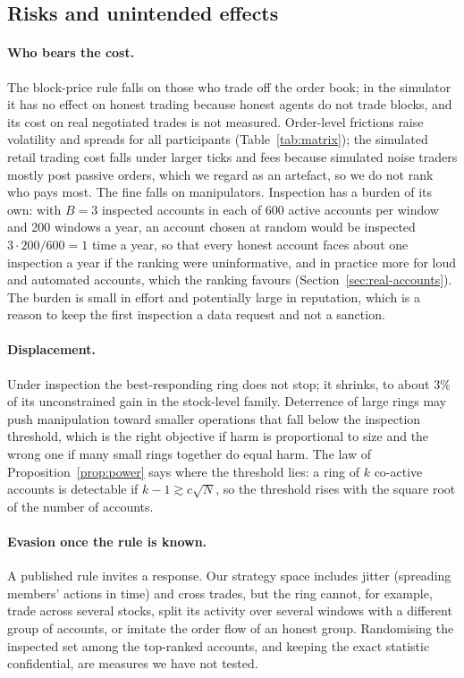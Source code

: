 \subsection{Risks and unintended effects}

\paragraph{Who bears the cost.} The block-price rule falls on those who trade off the order book; in the simulator it has no effect on honest trading because honest agents do not trade blocks, and its cost on real negotiated trades is not measured. Order-level frictions raise volatility and spreads for all participants (Table~\ref{tab:matrix}); the simulated retail trading cost falls under larger ticks and fees because simulated noise traders mostly post passive orders, which we regard as an artefact, so we do not rank who pays most. The fine falls on manipulators. Inspection has a burden of its own: with $B=3$ inspected accounts in each of 600 active accounts per window and 200 windows a year, an account chosen at random would be inspected $3\cdot200/600=1$ time a year, so that every honest account faces about one inspection a year if the ranking were uninformative, and in practice more for loud and automated accounts, which the ranking favours (Section~\ref{sec:real-accounts}). The burden is small in effort and potentially large in reputation, which is a reason to keep the first inspection a data request and not a sanction.

\paragraph{Displacement.} Under inspection the best-responding ring does not stop; it shrinks, to about 3\% of its unconstrained gain in the stock-level family. Deterrence of large rings may push manipulation toward smaller operations that fall below the inspection threshold, which is the right objective if harm is proportional to size and the wrong one if many small rings together do equal harm. The law of Proposition~\ref{prop:power} says where the threshold lies: a ring of $k$ co-active accounts is detectable if $k-1\gtrsim c\sqrt N$, so the threshold rises with the square root of the number of accounts.

\paragraph{Evasion once the rule is known.} A published rule invites a response. Our strategy space includes jitter (spreading members' actions in time) and cross trades, but the ring cannot, for example, trade across several stocks, split its activity over several windows with a different group of accounts, or imitate the order flow of an honest group. Randomising the inspected set among the top-ranked accounts, and keeping the exact statistic confidential, are measures we have not tested.

